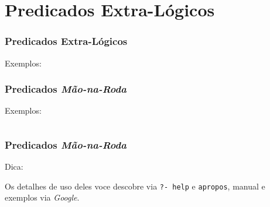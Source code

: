 \documentclass[sans]{beamer}
\begin{document}
\section{Predicados Extra-Lógicos}
\begin{frame}

\frametitle{Predicados Extra-Lógicos}
\begin{block}{Exemplos:}



\end{block}
\end{frame}


\begin{frame}
\frametitle{Predicados \textit{Mão-na-Roda}}

\begin{block}{Exemplos:}

{\scriptsize
\inputminted{Prolog}{prolog/predicados2.txt}
}
    
\end{block}
\end{frame}


\begin{frame}
\frametitle{Predicados \textit{Mão-na-Roda}}

\begin{block}{Dica:}

 Os detalhes de uso deles voce descobre via {\tt ?- help} e {\tt apropos}, manual  e exemplos
via {\em Google}.



\end{block}
\end{frame}

\end{document}
